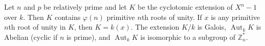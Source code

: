 Let $n$ and $p$ be relatively prime and let $K$ be the cyclotomic extension of $X^n - 1$ over $k$. Then $K$ contains $\varphi(n)$ primitive $n$th roots of unity. If $x$ is any primitive $n$th root of unity in $K$, then $K = k(x)$. The extension $K/k$ is Galois, $\operatorname{Aut}_k K$ is Abelian (cyclic if $n$ is prime), and $\operatorname{Aut}_k K$ is isomorphic to a subgroup of $\mathbb{Z}_n^*$.
